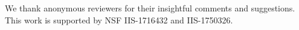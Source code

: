 We thank anonymous reviewers for their insightful comments and suggestions. This work is supported by NSF IIS-1716432 and IIS-1750326.